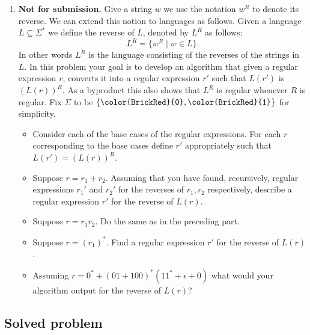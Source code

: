 \documentclass[11pt]{article}
\def\Sym#1{\texttt{\upshape \color{BrickRed} {#1}}}
\begin{document}
\begin{enumerate}
\item {\bf Not for submission.} Give a string $w$ we use the notation $w^R$ to denote its
  reverse. We can extend this notion to languages as follows.
  Given a language $L \subseteq \Sigma^*$ we define the reverse of
  $L$, denoted by $L^R$ as follows:
  $$L^R = \{w ^R \mid w \in L\}.$$
  In other words $L^R$ is the language consisting of the reverses of
  the strings in $L$. In this problem your goal is to develop an
  algorithm that given a regular expression $r$, converts it into a
  regular expression $r'$ such that $L(r')$ is $(L(r))^R$. As a
  byproduct this also shows that $L^R$ is regular whenever $R$ is
  regular. Fix $\Sigma$ to be $\{\Sym0,\Sym1\}$ for simplicity.
  \begin{itemize}
  \item Consider each of the base cases of the regular expressions.
    For each $r$ corresponding to the base cases define $r'$
    appropriately
    such that $L(r') = (L(r))^R$.
  \item Suppose $r = r_1 + r_2$. Assuming that you have found,
    recursively, regular expressions $r_1'$ and $r_2'$ for the
    reverses of $r_1,r_2$ respectively, describe a regular expression
    $r'$ for the reverse of $L(r)$.
  \item Suppose $r = r_1r_2$. Do the same as in the preceding part.
  \item Suppose $r = (r_1)^*$. Find a regular expression $r'$ for
    the reverse of $L(r)$.
  \item Assuming $r = 0^* + (01+ 100)^*(11^*+\epsilon+0)$ what would
    your algorithm output for the reverse of $L(r)$?
  \end{itemize}


\end{enumerate}
\subsection*{Solved problem}
\end{document}
